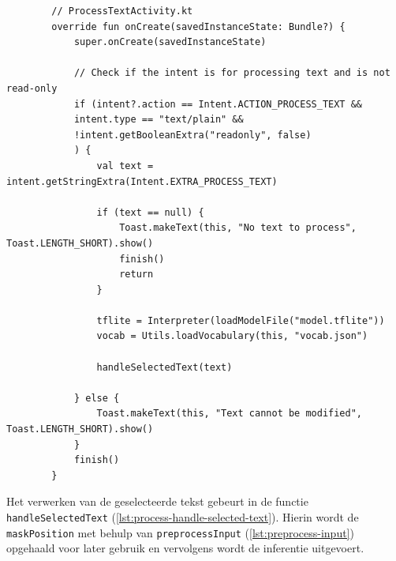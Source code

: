 \begin{listing}
    \begin{verbatim}
        // ProcessTextActivity.kt
        override fun onCreate(savedInstanceState: Bundle?) {
            super.onCreate(savedInstanceState)
            
            // Check if the intent is for processing text and is not read-only
            if (intent?.action == Intent.ACTION_PROCESS_TEXT &&
            intent.type == "text/plain" &&
            !intent.getBooleanExtra("readonly", false)
            ) {
                val text = intent.getStringExtra(Intent.EXTRA_PROCESS_TEXT)
                
                if (text == null) {
                    Toast.makeText(this, "No text to process", Toast.LENGTH_SHORT).show()
                    finish()
                    return
                }
                
                tflite = Interpreter(loadModelFile("model.tflite"))
                vocab = Utils.loadVocabulary(this, "vocab.json")
                
                handleSelectedText(text)
                
            } else {
                Toast.makeText(this, "Text cannot be modified", Toast.LENGTH_SHORT).show()
            }
            finish()
        }
    \end{verbatim}
    \caption[\texttt{ProcessTextActivity.kt} (deel 1)]{Het eerste deel van \texttt{ProcessTextActivity.kt} controleert of de intent van het juiste type is en haalt de geselecteerde tekst op voor verwerking.}
    \label{lst:process-text-check}
\end{listing}

Het verwerken van de geselecteerde tekst gebeurt in de functie \texttt{handleSelected\-Text} (\ref{lst:process-handle-selected-text}). Hierin wordt de \texttt{maskPosition} met behulp van \texttt{preprocessInput} (\ref{lst:preprocess-input}) opgehaald voor later gebruik en vervolgens wordt de inferentie uitgevoert.

